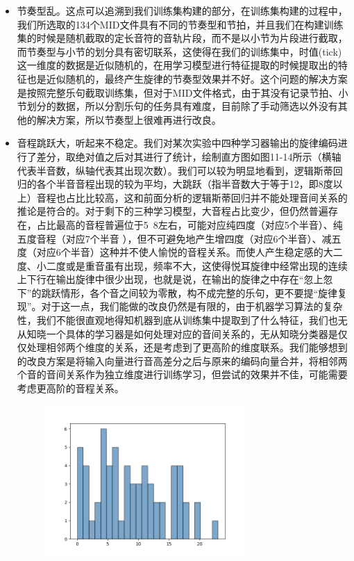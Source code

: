 \documentclass[UTF8,a4paper,10pt]{ctexart}
\begin{document}
\begin{itemize}
	\item 节奏型乱。这点可以追溯到我们训练集构建的部分，在训练集构建的过程中，我们所选取的134个MID文件具有不同的节奏型和节拍，并且我们在构建训练集的时候是随机截取的定长音符的音轨片段，而不是以小节为片段进行截取，而节奏型与小节的划分具有密切联系，这使得在我们的训练集中，时值(tick)这一维度的数据是近似随机的，在用学习模型进行特征提取的时候提取出的特征也是近似随机的，最终产生旋律的节奏型效果并不好。这个问题的解决方案是按照完整乐句截取训练集，但对于MID文件格式，由于其没有记录节拍、小节划分的数据，所以分割乐句的任务具有难度，目前除了手动筛选以外没有其他的解决方案，所以节奏型上很难再进行改良。
	\item 音程跳跃大，听起来不稳定。我们对某次实验中四种学习器输出的旋律编码进行了差分，取绝对值之后对其进行了统计，绘制直方图如图11-14所示（横轴代表半音数，纵轴代表其出现次数）。我们可以较为明显地看到，逻辑斯蒂回归的各个半音音程出现的较为平均，大跳跃（指半音数大于等于12，即8度以上）音程也占比比较高，这和前面分析的逻辑斯蒂回归并不能处理音间关系的推论是符合的。对于剩下的三种学习模型，大音程占比变少，但仍然普遍存在，占比最高的音程普遍位于5~8左右，可能对应纯四度（对应5个半音）、纯五度音程（对应7个半音 ），但不可避免地产生增四度（对应6个半音）、减五度（对应6个半音）这种并不使人愉悦的音程关系。而使人产生稳定感的大二度、小二度或是重音虽有出现，频率不大，这使得悦耳旋律中经常出现的连续上下行在输出旋律中很少出现，也就是说，在输出的旋律之中存在“忽上忽下”的跳跃情形，各个音之间较为零散，构不成完整的乐句，更不要提“旋律复现”。对于这一点，我们能做的改良仍然是有限的，由于机器学习算法的复杂性，我们不能很直观地得知机器到底从训练集中提取到了什么特征，我们也无从知晓一个具体的学习器是如何处理对应的音间关系的，无从知晓分类器是仅仅处理相邻两个维度的关系，还是考虑到了更高阶的维度联系。我们能够想到的改良方案是将输入向量进行音高差分之后与原来的编码向量合并，将相邻两个音的音间关系作为独立维度进行训练学习，但尝试的效果并不佳，可能需要考虑更高阶的音程关系。
\begin{figure}[H]
\begin{minipage}[t]{0.5\linewidth}
\centering
\includegraphics[width=3in]{output_logreg_hist.png}

\end{minipage}
\end{figure}
\end{itemize}
\end{document}
